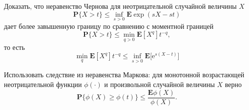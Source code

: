 
\begin{problem}

Доказать, что неравенство Чернова для неотрицательной случайной величины $X$
\begin{equation*}
\mathbf{P}\{ X >t\}\leq \inf_{s>0}\mathbf{E}\exp(sX-st)
\end{equation*}
 дает более завышенную границу по сравнению с моментной границей
\begin{equation*}
\mathbf{P}\{ X >t\}\leq \min_{q>0}\mathbf{E}[X^q]t^{-q},
\end{equation*}
 то есть 
\begin{equation*}
\min_q\mathbf{E}[X^q]t^{-q}\leq \inf_{s>0}\mathbf{E}\big[\text{e}^{s(X-t)}\bigl]
\end{equation*}
\end{problem}

\begin{remark} Использовать следствие из неравенства Маркова: для монотонной возрастающей неотрицательной функции $\phi(\cdot)$ и произвольной случайной величины $X$ верно
\begin{equation*}
\mathbf{P}\{\phi(X)\geq \phi(t)\}\leq \frac{\mathbf{E}\phi(X)}{\phi(X)}.
\end{equation*}
\end{remark}



